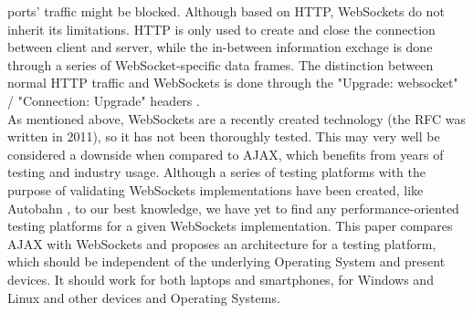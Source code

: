 \documentclass[conference]{IEEEtran}
\begin{document}
ports' traffic might be blocked. Although based on HTTP, WebSockets do not
inherit its limitations. HTTP is only used to create and close the connection
between client and server, while the in-between information exchage is done
through a series of WebSocket-specific data frames. The distinction between
normal HTTP traffic and WebSockets is done through the "Upgrade: websocket" /
"Connection: Upgrade" headers \cite{RFC}.
\\
\indent
As mentioned above, WebSockets are a recently created technology 
(the RFC was written in 2011), so it has not been thoroughly tested. This may
very well be considered a downside when compared to AJAX, which benefits from
years of testing and industry usage. Although a series of testing platforms
with the purpose of validating WebSockets implementations have been created,
like Autobahn \cite{Autobahn}, to our best knowledge, we have yet to find any
performance-oriented testing platforms for a given WebSockets implementation.
This paper compares AJAX with WebSockets and proposes an architecture for
a testing platform, which should be independent of the underlying Operating
System and present devices. It should work for both laptops and smartphones,
for Windows and Linux and other devices and Operating Systems.
\end{document}

